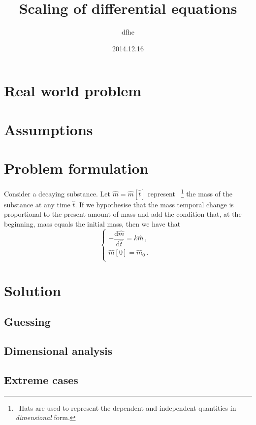 \documentclass[9pt,reqno]{amsart}
\title{Scaling of differential equations}
\author{dfhe}
\date{2014.12.16}
\providecommand*{\vat}[1]{\!\left[#1\right]}  %
\providecommand*{\dx}{\text{d}}                     %
\providecommand*{\xod}[2]{\dfrac{\dx{#1}}{\dx{#2}}} %
\providecommand*{\mass}{m}           %
\providecommand*{\kdecay}{k}         %
\providecommand*{\dlpq}[1]{\hat{#1}}      %
\begin{document}
%
\maketitle
%
\setcounter{tocdepth}{1}
\tableofcontents


\section{Real world problem}
%


\section{Assumptions}
%


\section{Problem formulation}
%
Consider a decaying substance. Let $\dlpq\mass = \dlpq\mass\vat{\dlpq t}$ represent
%
~\footnote{~Hats are used to represent the dependent and independent quantities in \emph{dimensional} form.}
%
the mass of the substance at any time $\dlpq t$. If we hypothesise that the mass temporal change is proportional to the present amount of mass and add the condition that, at the beginning, mass equals the initial mass, then we have that
%
\begin{equation}
  \begin{cases}
    -\xod{\dlpq\mass}{\dlpq t} = \kdecay\dlpq\mass\,, & \\
    \dlpq\mass\vat 0 = \dlpq\mass_0\,. & \\
  \end{cases}
\end{equation}



\section{Solution}
%


\subsection{Guessing}
%


\subsection{Dimensional analysis}
%


\subsection{Extreme cases}
%
\end{document}
